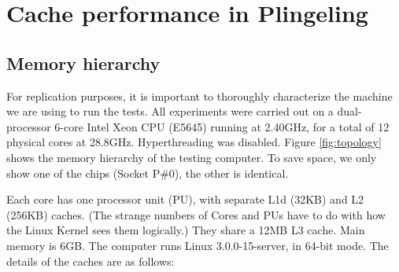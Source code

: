 \documentclass{llncs}
\begin{document}

\section{Cache performance in Plingeling}
\subsection{Memory hierarchy}
\label{sec:memhier}

For replication purposes, it is important to thoroughly characterize
the machine we are using to run the tests. All experiments were
carried out on a dual-processor 6-core Intel Xeon CPU (E5645) running
at 2.40GHz, for a total of 12 physical cores at
28.8GHz. Hyperthreading was disabled. Figure \ref{fig:topology} shows
the memory hierarchy of the testing computer. To save space, we only
show one of the chips (Socket P\#0), the other is identical.


Each core has one processor unit (PU), with separate L1d (32KB) and L2
(256KB) caches. (The strange numbers of Cores and PUs have to do with
how the Linux Kernel sees them logically.) They share a 12MB L3
cache. Main memory is 6GB. The computer runs Linux 3.0.0-15-server, in
64-bit mode. The details of the caches are as follows:
\end{document}

